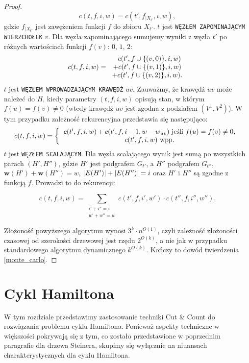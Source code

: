 \documentclass[12pt, oneside]{report}
\newcommand\Omicron{O}
\begin{document}
\begin{proof}
$$c(t,f,i,w) = c(t',f_{\big|X_{t'}},i,w),$$ gdzie $f_{\big|X_{t'}}$ jest zawężeniem funkcji $f$ do zbioru $X_{t'}$.
\newline\newline
$t$ jest \texttt{WĘZŁEM ZAPOMINAJĄCYM WIERZCHOŁEK} $v$. Dla węzła zapominającego sumujemy wyniki z węzła $t'$ po różnych wartościach funkcji $f(v)$: $0$, $1$, $2$:
\[
c(t,f,i,w) =  
  \begin{tabular}{ccc}
  $\ \ c(t',f \cup \{(v, 0)\},i,w)$\\
  $+ c(t',f \cup \{(v, 1)\},i,w)$\\
  $+ c(t',f \cup \{(v, 2)\},i,w).$
  \end{tabular}
\]
\newline
$t$ jest \texttt{WĘZŁEM WPROWADZAJĄCYM KRAWĘDŹ} $uv$. Zauważmy, że krawędź $uv$ może należeć do $H$, kiedy parametry $(t,f,i,w)$ opisują stan, w którym $f(u) = f(v) \neq 0$ (wtedy krawędź $uv$ jest zgodna z podziałem $(V^1, V^2)$). W tym przypadku zależność rekurencyjna przedstawia się następująco:
\[
c(t,f,i,w) =  
\left \{
  \begin{tabular}{ccc}
  $c(t',f,i,w) + c(t',f,i-1,w-w_{uv})$ jeśli $f(u) = f(v) \neq 0$, \\
  $c(t',f,i,w)$ wpp. \\
  \end{tabular}
\right. 
\]
$t$ jest \texttt{WĘZŁEM SCALAJĄCYM}. Dla węzła scalającego wynik jest sumą po wszystkich parach $(H', H'')$, gdzie $H'$ jest podgrafem $G_{t'}$, a $H''$ podgrafem $G_{t''}$, $\mathbf{w}(H') + \mathbf{w}(H'') = w$, $\abs{E(H')} + \abs{E(H'')} = i$ oraz $H'$ i $H''$ są zgodne z funkcją $f$. Prowadzi to do rekurencji:

$$c(t,f,i,w) = \sum_{\substack{
   i' + i'' = i \\
   w' + w'' = w
  }} c(t',f,i',w') \cdot c(t'',f,i'',w'').$$

Złożoność powyższego algorytmu wynosi $3^k \cdot n^{\Omicron(1)}$, czyli zależność złożoności czasowej od szerokości drzewowej jest rzędu $2^{\Omicron(k)}$, a nie jak w przypadku standardowego algorytmu dynamicznego $k^{\Omicron(k)}$. Kończy to dowód twierdzenia \ref{monte_carlo}.
\end{proof}

    	\section{Cykl Hamiltona}

W tym rozdziale przedstawimy zastosowanie techniki Cut \& Count do rozwiązania problemu cyklu Hamiltona. Ponieważ aspekty techniczne w większości pokrywają się z tym, co zostało przedstawione w poprzednim paragrafie dla drzewa Steinera, skupimy się wyłącznie na niuansach charakterystycznych dla cyklu Hamiltona.
\end{document}
